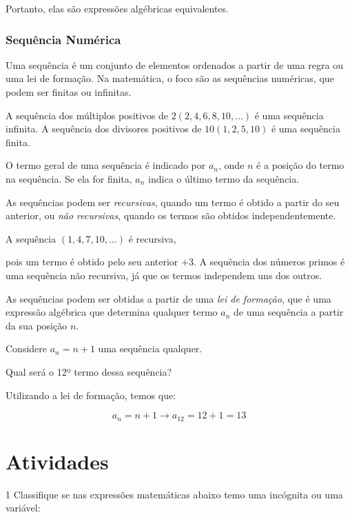 {Portanto, elas são
expressões algébricas equivalentes.

\subsubsection{Sequência Numérica}

Uma sequência é um conjunto de elementos ordenados a partir de uma regra
ou uma lei de formação. Na matemática, o foco são as sequências
numéricas, que podem ser finitas ou infinitas.

\medskip{} 

A sequência dos múltiplos positivos de $2 (2, 4, 6, 8, 10, ...)$ é uma sequência infinita. A sequência dos
divisores positivos de $10 (1, 2, 5, 10)$ é uma sequência finita.

O termo geral de uma sequência é indicado por $a_{n}$, onde $n$  é
a posição do termo na sequência. Se ela for finita, $a_{n}$ indica o
último termo da sequência.

As sequências podem ser \emph{recursivas}, quando um termo é
obtido a partir do seu anterior, ou \emph{não recursivas}, quando
os termos são obtidos independentemente.

\medskip{} 

A sequência $(1, 4, 7, 10, ...)$ é recursiva,

pois um termo é obtido pelo seu anterior $+3$. A sequência dos números
primos é uma sequência não recursiva, já que os termos independem uns
dos outros.

As sequências podem ser obtidas a partir de uma \emph{lei de
formação}, que é uma expressão algébrica que determina qualquer termo
$a_{n}$  de uma sequência a partir da sua posição $n$.

\medskip{} 

Considere $a_{n} = n + 1$ uma sequência qualquer.

Qual será o 12º termo dessa sequência?

Utilizando a lei de formação, temos que:

$$a_{n} = n + 1 \rightarrow a_{12} = 12 + 1 = 13$$
}

\section*{Atividades}

\num{1} Classifique se nas expressões matemáticas abaixo temo uma incógnita
ou uma variável:

